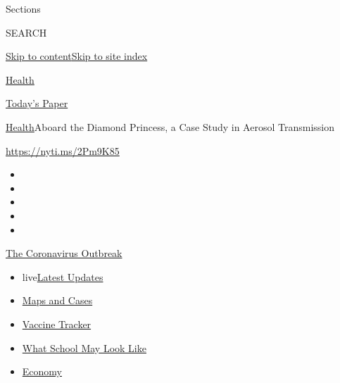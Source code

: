 Sections

SEARCH

\protect\hyperlink{site-content}{Skip to
content}\protect\hyperlink{site-index}{Skip to site index}

\href{https://www.nytimes3xbfgragh.onion/section/health}{Health}

\href{https://myaccount.nytimes3xbfgragh.onion/auth/login?response_type=cookie\&client_id=vi}{}

\href{https://www.nytimes3xbfgragh.onion/section/todayspaper}{Today's
Paper}

\href{/section/health}{Health}\textbar{}Aboard the Diamond Princess, a
Case Study in Aerosol Transmission

\url{https://nyti.ms/2Pm9K85}

\begin{itemize}
\item
\item
\item
\item
\item
\end{itemize}

\href{https://www.nytimes3xbfgragh.onion/news-event/coronavirus?action=click\&pgtype=Article\&state=default\&region=TOP_BANNER\&context=storylines_menu}{The
Coronavirus Outbreak}

\begin{itemize}
\tightlist
\item
  live\href{https://www.nytimes3xbfgragh.onion/2020/08/01/world/coronavirus-covid-19.html?action=click\&pgtype=Article\&state=default\&region=TOP_BANNER\&context=storylines_menu}{Latest
  Updates}
\item
  \href{https://www.nytimes3xbfgragh.onion/interactive/2020/us/coronavirus-us-cases.html?action=click\&pgtype=Article\&state=default\&region=TOP_BANNER\&context=storylines_menu}{Maps
  and Cases}
\item
  \href{https://www.nytimes3xbfgragh.onion/interactive/2020/science/coronavirus-vaccine-tracker.html?action=click\&pgtype=Article\&state=default\&region=TOP_BANNER\&context=storylines_menu}{Vaccine
  Tracker}
\item
  \href{https://www.nytimes3xbfgragh.onion/interactive/2020/07/29/us/schools-reopening-coronavirus.html?action=click\&pgtype=Article\&state=default\&region=TOP_BANNER\&context=storylines_menu}{What
  School May Look Like}
\item
  \href{https://www.nytimes3xbfgragh.onion/live/2020/07/31/business/stock-market-today-coronavirus?action=click\&pgtype=Article\&state=default\&region=TOP_BANNER\&context=storylines_menu}{Economy}
\end{itemize}

